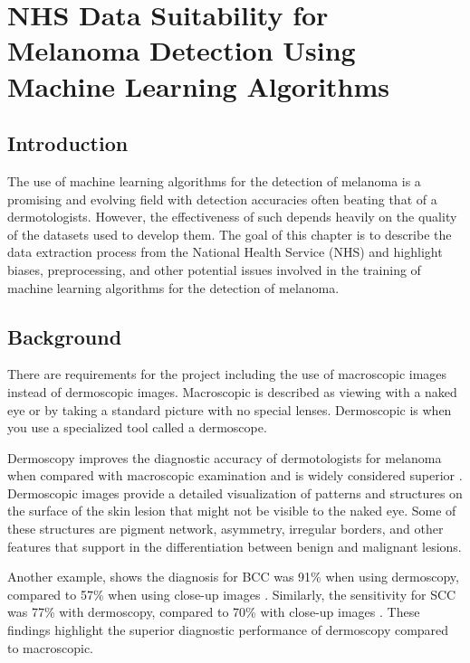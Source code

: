 \chapter{NHS Data Suitability for Melanoma Detection Using Machine Learning Algorithms}

\section{Introduction}
The use of machine learning algorithms for the detection of melanoma is a promising and evolving field with detection accuracies often beating that of a dermotologists\cite{}. However, the effectiveness of such depends heavily on the quality of the datasets used to develop them\cite{}. The goal of this chapter is to describe the data extraction process from the National Health Service (NHS) and highlight biases, preprocessing, and other potential issues involved in the training of machine learning algorithms for the detection of melanoma.

\section{Background}

There are requirements for the project including the use of macroscopic images instead of dermoscopic images. Macroscopic is described as viewing with a naked eye or by taking a standard picture with no special lenses. Dermoscopic is when you use a specialized tool called a dermoscope.

Dermoscopy improves the diagnostic accuracy of dermotologists for melanoma when compared with macroscopic examination\cite{Wolner et al., 2017} and is widely considered superior \cite{Vestergaard et al., 2008}. Dermoscopic images provide a detailed visualization of patterns and structures on the surface of the skin lesion that might not be visible to the naked eye\cite{Vestergaard et al., 2008, Oliveira, R}. Some of these structures are pigment network, asymmetry, irregular borders, and other features that support in the differentiation between benign and malignant lesions\cite{Vestergaard et al., 2008}. 

Another example, shows the diagnosis for BCC was 91\% when using dermoscopy, compared to 57\% when using close-up images \cite{Dascalu et al., 2021}. Similarly, the sensitivity for SCC was 77\% with dermoscopy, compared to 70\% with close-up images \cite{Dascalu et al., 2021}. These findings highlight the superior diagnostic performance of dermoscopy compared to macroscopic.

